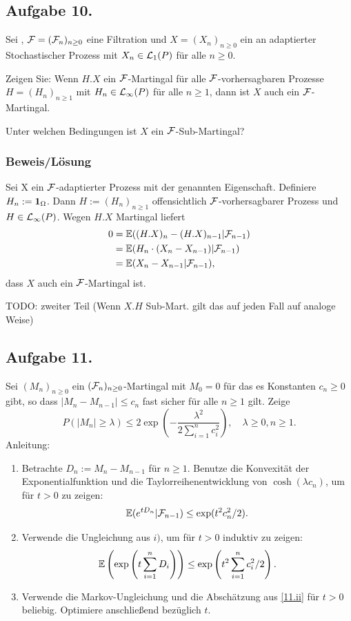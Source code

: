\documentclass[12pt]{scrartcl}
\date{\today}
\begin{document}
	
\subsection*{Aufgabe 10.}

Sei \WraumAnn{}, $\mathcal{F}=(\mathcal{F}_n)_{n\ge 0}$ eine Filtration und $X=(X_n)_{n\ge 0}$ ein an \F{} adaptierter Stochastischer Prozess mit $X_n\in\mathcal{L}_1(P)$ für alle $n\ge 0$.
\bigskip

Zeigen Sie: Wenn $H.X$ ein $\mathcal{F}$-Martingal für alle $\mathcal{F}$-vorhersagbaren Prozesse $H=(H_n)_{n\ge 1}$ mit $H_n\in\mathcal{L}_{\infty}(P)$ für alle $n\ge 1$, dann ist $X$ auch ein $\mathcal{F}$-Martingal.
\bigskip

Unter welchen Bedingungen ist $X$ ein $\mathcal{F}$-Sub-Martingal?

\subsubsection*{Beweis/Lösung}
\einruecken

Sei X ein $\mathcal{F}$-adaptierter Prozess mit der genannten Eigenschaft. Definiere $H_n:=\textbf{1}_{\Omega}$. Dann $H:=(H_n)_{n\ge 1}$ offensichtlich $\mathcal{F}$-vorhersagbarer Prozess und $H\in\mathcal{L}_{\infty}(P)$.
Wegen $H.X$ Martingal liefert
\begin{align*}
0 &= \mathbb{E}((H.X)_n-(H.X)_{n-1}|\mathcal{F}_{n-1}) \\
&= \mathbb{E}(H_n\cdot(X_n-X_{n-1})|\mathcal{F}_{n-1}) \\
&= \mathbb{E}(X_n-X_{n-1}|\mathcal{F}_{n-1}),
\end{align*}
dass $X$ auch ein $\mathcal{F}$-Martingal ist.
\bigskip

TODO: zweiter Teil (Wenn $X.H$ Sub-Mart. gilt das auf jeden Fall auf analoge Weise)

\ausruecken
\subsection*{Aufgabe 11.}

Sei $(M_n)_{n\ge 0}$ ein $(\mathcal{F}_n)_{n\ge 0}$-Martingal mit $M_0=0$ für das es Konstanten $c_n\ge 0$ gibt, so dass $|M_n-M_{n-1}|\le c_n$ fast sicher für alle $n\ge 1$ gilt. Zeige
$$P(|M_n|\ge\lambda)\le 2\exp \left(-\frac{\lambda^2}{2\sum_{i=1}^n c_i^2}\right),\quad \lambda\ge 0, n\ge 1.$$
Anleitung:
\begin{enumerate}[$i)$]
\item Betrachte $D_n:=M_n-M_{n-1}$ für $n\ge 1$. Benutze die Konvexität der Exponentialfunktion und die Taylorreihenentwicklung von $\cosh(\lambda c_n)$, um für $t>0$ zu zeigen:
$$\mathbb{E}(e^{tD_n}|\mathcal{F}_{n-1})\le\exp(t^2 c_n^2/2).$$
\item \label{11.ii} Verwende die Ungleichung aus $i)$, um für $t>0$ induktiv zu zeigen:
$$\mathbb{E}\left(\exp\left(t\sum_{i=1}^n D_i\right)\right)\le\exp\left(t^2\sum_{i=1}^n c_i^2/2\right).$$
\item Verwende die Markov-Ungleichung und die Abschätzung aus \ref{11.ii} für $t>0$ beliebig. Optimiere anschließend bezüglich $t$.
\end{enumerate}
\end{document}
